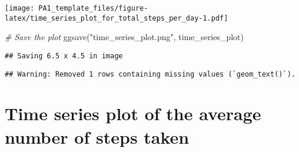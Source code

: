 \documentclass[
]{article}
\newenvironment{Shaded}{\begin{snugshade}}{\end{snugshade}}
\newcommand{\CommentTok}[1]{\textcolor[rgb]{0.56,0.35,0.01}{\textit{#1}}}
\newcommand{\FunctionTok}[1]{\textcolor[rgb]{0.00,0.00,0.00}{#1}}
\newcommand{\NormalTok}[1]{#1}
\newcommand{\StringTok}[1]{\textcolor[rgb]{0.31,0.60,0.02}{#1}}
\begin{document}
\texttt{[image: PA1\_template\_files/figure-latex/time\_series\_plot\_for\_total\_steps\_per\_day-1.pdf]}

\begin{Shaded}
\begin{Highlighting}[]
\CommentTok{\# Save the plot}
\FunctionTok{ggsave}\NormalTok{(}\StringTok{"time\_series\_plot.png"}\NormalTok{, time\_series\_plot)}
\end{Highlighting}
\end{Shaded}

\begin{verbatim}
## Saving 6.5 x 4.5 in image
\end{verbatim}

\begin{verbatim}
## Warning: Removed 1 rows containing missing values (`geom_text()`).
\end{verbatim}

\hypertarget{time-series-plot-of-the-average-number-of-steps-taken}{%
\section{Time series plot of the average number of steps
taken}\label{time-series-plot-of-the-average-number-of-steps-taken}}
\end{document}
